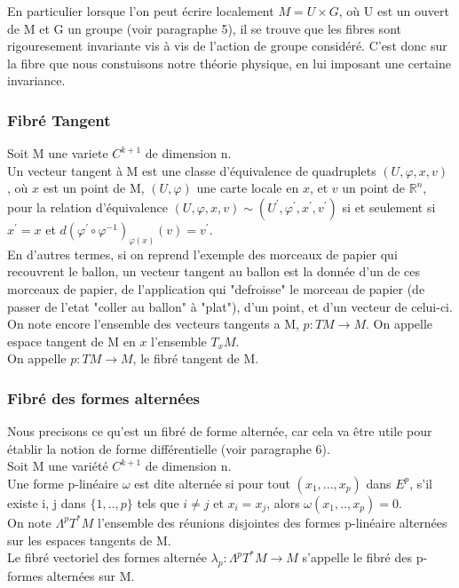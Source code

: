 \documentclass[a4paper,11pt]{article} %
\numberwithin{equation}{section} %
\numberwithin{figure}{section} %
\theoremstyle{plain} %
\theoremstyle{definition} %
\theoremstyle{remark} %
\begin{document}
\noindent
En particulier lorsque l'on peut \'ecrire localement $M = U \times G$, o\`u U est un ouvert de M et G  un groupe (voir paragraphe 5), il se trouve que les fibres sont rigouresement invariante vis \`a vis de l'action de groupe consid\'er\'e. C'est donc sur la fibre que nous constuisons notre th\'eorie physique, en lui imposant une certaine invariance. 

\subsubsection{Fibr\'e Tangent}

\noindent
Soit M une variete $C^{k+1}$ de dimension n.\\
Un vecteur tangent \`a M est une classe d'\'equivalence de quadruplets $(U,\varphi,x,v)$ , o\`u $x$ est un point de M,  $(U,\varphi)$ une carte locale en $x$, et $v$ un point de $ \mathbb{R}^{n}$, pour la relation d'\'equivalence  $(U,\varphi,x,v) \sim (U^{'},\varphi^{'},x^{'},v^{'})$ si et seulement si $x^{'}=x$ et $d(\varphi^{'} \circ \varphi^{-1})_{\varphi(x)} (v) = v^{'}$.\\

\noindent
En d'autres termes, si on reprend l'exemple des morceaux de papier qui recouvrent le ballon, un vecteur tangent au ballon est la donn\'ee d'un de ces morceaux de papier, de l'application qui "defroisse" le morceau de papier (de passer de l'etat "coller au ballon" \`a "plat"), d'un point, et d'un vecteur de celui-ci.\\

\noindent
On note encore l'ensemble des vecteurs tangents a M, $p : TM \rightarrow M$. On appelle espace tangent de M en $x$ l'ensemble $T_x M$.\\

\noindent
On appelle $p : TM \rightarrow M$, le fibr\'e tangent de M.\\

\subsubsection{Fibr\'e des formes altern\'ees}

\noindent
Nous precisons ce qu'est un fibr\'e de forme altern\'ee, car cela va \^etre utile pour \'etablir la notion de forme diff\'erentielle (voir paragraphe 6).\\

\noindent
Soit M une vari\'et\'e $C^{k+1}$ de dimension n.\\
Une forme p-lin\'eaire $\omega$ est dite altern\'ee si pour tout $(x_1,...,x_p)$ dans $E^p$, s'il existe i, j dans $\{1,..,p\}$ tels que $i \neq j$ et $x_i = x_j$, alors $\omega(x_1,..,x_p)=0$.\\
On note $\Lambda^pT^*M$ l'ensemble des r\'eunions disjointes des formes p-lin\'eaire altern\'ees sur les espaces tangents de M.\\
Le fibr\'e vectoriel des formes altern\'ee  $ \lambda_p:\Lambda^pT^*M \rightarrow M$ s'appelle le fibr\'e des p-formes altern\'ees sur M.\\
\end{document}
